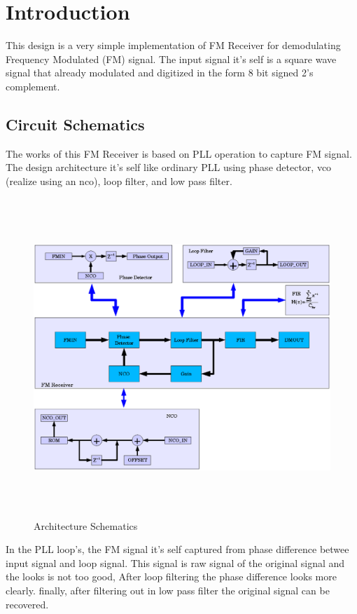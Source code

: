 \documentclass[a4paper,10pt]{article}
\begin{document}
\listoffigures
\newpage

\section{Introduction}

\pagestyle{fancy}

This design is a very simple implementation of FM Receiver for
demodulating Frequency Modulated (FM) signal.  The input signal it's
self is a square wave signal that already modulated and digitized in the
form 8 bit signed 2's complement.

\subsection{Circuit Schematics}

The works of this FM Receiver is based on PLL operation to capture FM
signal.  The design architecture it's self like ordinary PLL using phase
detector, vco (realize using an nco), loop filter, and low pass filter.

\begin{figure}[H]
\center
\includegraphics[width=15cm,height=12cm]{fm_receiver.eps}
\caption {Architecture Schematics}
\end{figure}

In the PLL loop's, the FM signal it's self captured from phase
difference betwee input signal and loop signal. This signal is raw
signal of the original signal and the looks is not too good, After loop
filtering the phase difference looks more clearly. finally, after
filtering out in low pass filter the original signal can be recovered.
\end{document}
